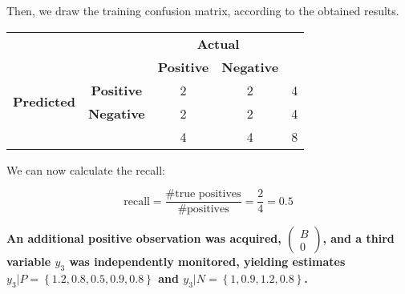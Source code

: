 \documentclass[12pt]{article}
\begin{document}
\begin{enumerate}[leftmargin=\labelsep]
          Then, we draw the training confusion matrix, according to the obtained results.

          \begin{center}
              \begin{tabular}{|c|c|c|c|c|}
                  \cline{3-4}
                  \multicolumn{2}{c}{}                & \multicolumn{2}{|c|}{\textbf{Actual}} & \multicolumn{1}{c}{}                            \\
                  \cline{3-4}
                  \multicolumn{2}{c|}{}               & \textbf{Positive}                     & \textbf{Negative}    & \multicolumn{1}{c}{}     \\
                  \hline
                  \multirow{2}{*}{\textbf{Predicted}} & \textbf{Positive}                     & 2                    & 2                    & 4 \\
                  \cline{2-5}
                                                      & \textbf{Negative}                     & 2                    & 2                    & 4 \\
                  \hline
                  \multicolumn{2}{c|}{}               & 4                                     & 4                    & 8                        \\
                  \cline{3-5}
              \end{tabular}
          \end{center}

          We can now calculate the recall:

          \[
              \text{recall} = \frac{\#\text{true positives}}{\#\text{positives}} = \frac{2}{4} = 0.5
          \]

\end{enumerate}

{\bfseries
An additional positive observation was acquired, \(
\begin{pmatrix}
    B \\
    0
\end{pmatrix}
\), and a third variable \(y_3\) was independently monitored, yielding estimates
\(
y_3 | P = \left\{1.2, 0.8, 0.5, 0.9, 0.8\right\}
\) and \(
y_3 | N = \left\{1, 0.9, 1.2, 0.8\right\}
\).
}
\end{document}
